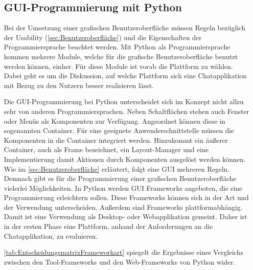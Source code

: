 \documentclass[a4paper,titlepage,halfparskip,12pt]{scrreprt}
\begin{document}
\begin{onehalfspacing}
\section{GUI-Programmierung mit Python}
\label{sec:GuiPython}

Bei der Umsetzung einer grafischen Benutzeroberfläche müssen Regeln bezüglich der Usability (\autoref{sec:Benutzeroberfläche}) und die Eigenschaften der Programmiersprache beachtet werden. Mit Python als Programmiersprache kommen mehrere Module, welche für die grafische Benutzeroberfläche benutzt werden können, einher. Für diese Module ist vorab die Plattform zu wählen. Dabei geht es um die Diskussion, auf welche Plattform sich eine Chatapplikation mit Bezug zu den Nutzern besser realisieren lässt.

Die \ac{GUI}-Programmierung bei Python unterscheidet sich im Konzept nicht allzu sehr von anderen Programmiersprachen. Neben Schaltflächen stehen auch Fenster oder Menüs als Komponenten zur Verfügung. Angeordnet können diese in sogenannten Container. Für eine geeignete Anwenderschnittstelle müssen die Komponenten in die Container integriert werden. Hinzukommt ein äußerer Container, auch als Frame bezeichnet, ein Layout-Manager und eine Implementierung damit Aktionen durch Komponenten ausgelöst werden können. Wie im \autoref{sec:Benutzeroberfläche} erläutert, folgt eine \ac{GUI} mehreren Regeln. Demnach gibt es für die Programmierung einer grafischen Benutzeroberfläche vielerlei Möglichkeiten. In Python werden \ac{GUI} Frameworks angeboten, die eine Programmierung erleichtern sollen. Diese Frameworks können sich in der Art und der Verwendung unterscheiden. Außerdem sind Frameworks plattformabhängig. Damit ist eine Verwendung als Desktop- oder Webapplikation gemeint. Daher ist in der ersten Phase eine Plattform, anhand der Anforderungen an die Chatapplikation, zu evaluieren.\cite{Steyer2018}

\pagebreak

\autoref{tab:EntscheidungsmatrixFrameworkart} spiegelt die Ergebnisse eines Vergleichs zwischen den Tool-Frameworks und den Web-Frameworks von Python wider.


\end{onehalfspacing}
\end{document}
